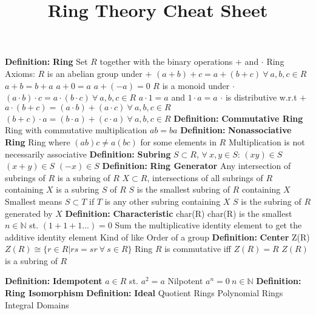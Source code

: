 \documentclass[14pt]{extarticle}
\title{Ring Theory Cheat Sheet}
\def\Definition{{\color{blue} \textbf{Definition:} }}
\begin{document}
	\maketitle

	\begin{outline}			
		\1	\Definition \textbf{Ring}
			\2	Set $R$ together with the binary operations $+$ and $\cdot$
			\2	Ring Axioms:
				\3	$R$ is an abelian group under $+$
					\4	$(a+b)+c = a+(b+c)~\forall~a,b,c \in R$
					\4	$a+b = b + a$
					\4	$a + 0 = a$
					\4	$a + (-a) = 0$
				\3	$R$ is a monoid under $\cdot$
					\4	$(a \cdot b) \cdot c = a \cdot (b \cdot c)~\forall~a,b,c \in R$
					\4	$a \cdot 1 = a$ and $1 \cdot a = a$
				\3	$\cdot$ is distributive w.r.t $+$
					\4	$a \cdot (b + c) = (a\cdot b) + (a\cdot c)~\forall~a,b,c \in R$
					\4	$(b + c) \cdot a = (b \cdot a) + (c \cdot a)~\forall~a,b,c \in R$
		\1	\Definition \textbf{Commutative Ring}
			\2	Ring with commutative multiplication $ab = ba$
		\1	\Definition \textbf{Nonassociative Ring}
			\2	Ring where $(ab)c \ne a(bc)$ for some elements in $R$
			\2	Multiplication is not necessarily associative
		\1	\Definition \textbf{Subring}
			\2	$S \subset R$, $\forall~x,y \in S$:
				\3	$(xy) \in S$
				\3	$(x + y) \in S$
				\3	$(-x) \in S$
		\1	\Definition \textbf{Ring Generator}
			\2	Any intersection of subrings of $R$ is a subring of $R$
			\2	$X \subset R$, intersections of all subrings of $R$ containing $X$ is
					a subring $S$ of $R$
			\2	$S$ is the smallest subring of $R$ containing $X$
				\3	Smallest means $S \subset T$ if $T$ is any other subring containing $X$
			\2	$S$ is the subring of $R$ generated by $X$
		\1	\Definition \textbf{Characteristic} char(R)
			\2	char(R) is the smallest $n \in \mathbb{N}$ st. $(1 + 1 + 1...) = 0$
			\2	Sum the multiplicative identity element to get the additive identity element
			\2	Kind of like Order of a group
		\1	\Definition \textbf{Center} Z(R)
			\2	$Z(R) \cong \{r \in R | rs = sr~\forall~s \in R\}$
			\2	Ring $R$ is commutative iff $Z(R) = R$
			\2	$Z(R)$ is a subring of $R$

		\1	\Definition \textbf{Idempotent}
			\2	$a \in R$ st. $a^2 = a$
			\2	Nilpotent $a^n = 0~n \in \mathbb{N}$
		\1	\Definition \textbf{Ring Isomorphism}
		\1	\Definition \textbf{Ideal}
		\1	Quotient Rings
		\1	Polynomial Rings
		\1	Integral Domains
	\end{outline}
\end{document}
